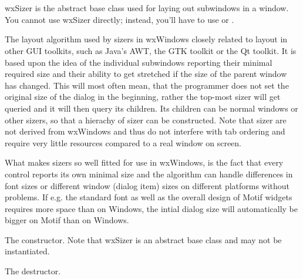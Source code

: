 \section{}\label{wxsizer}

wxSizer is the abstract base class used for laying out subwindows in a window. You
cannot use wxSizer directly; instead, you'll have to use  
or .

The layout algorithm used by sizers in wxWindows closely related to layout
in other GUI toolkits, such as Java's AWT, the GTK toolkit or the Qt toolkit. It is
based upon the idea of the individual subwindows reporting their minimal required
size and their ability to get stretched if the size of the parent window has changed.
This will most often mean, that the programmer does not set the original size of
the dialog in the beginning, rather the top-most sizer will get queried and it will 
then query its children. Its children can be normal windows or other sizers, so that
a hierachy of sizer can be constructed. Note that sizer are not derived from wxWindows
and thus do not interfere with tab ordering and require very little resources compared
to a real window on screen.

What makes sizers so well fitted for use in wxWindows, is the fact that every control
reports its own minimal size and the algorithm can handle differences in font sizes
or different window (dialog item) sizes on different platforms without problems. If e.g.
the standard font as well as the overall design of Motif widgets requires more space than
on Windows, the intial dialog size will automatically be bigger on Motif than on Windows.




\label{wxsizerwxsizer}


The constructor. Note that wxSizer is an abstract base class and may not
be instantiated.

\label{wxsizerdtor}


The destructor.

\label{wxsizeradd}


